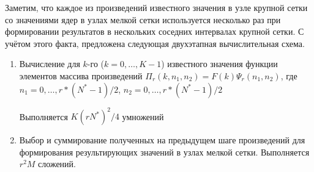 Заметим, 
что каждое из произведений известного значения в узле крупной сетки
со значениями ядер в узлах мелкой сетки используется несколько раз
при формировании результатов в нескольких соседних
интервалах крупной сетки. 
С учётом этого факта,
предложена следующая двухэтапная вычислительная схема.
\begin{enumerate}
\item
  Вычисление для $k$-го ($k = 0, \ldots, K-1$)
  известного значения функции 
  элементов массива произведений
  $\Pi_r(k,n_1, n_2) = F(k)\Psi_r(n_1, n_2)$,
  где $n_1=0, \ldots, r*(N^*-1)/2$,
      $n_2=0, \ldots, r*(N^*-1)/2$

  Выполняется $K(rN^*)^2 / 4$ умножений
  

\item
  Выбор и суммирование полученных на предыдущем шаге произведений
  для формирования результирующих значений в узлах мелкой сетки.
  Выполняется $r^2M$ сложений.
\end{enumerate}




